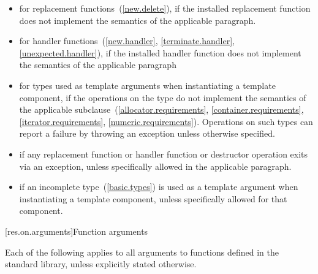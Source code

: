 \begin{itemize}
\item
for replacement functions~(\ref{new.delete}), if the installed replacement function does not
implement the semantics of the applicable
\required
paragraph.
\item
for handler functions~(\ref{new.handler}, \ref{terminate.handler}, \ref{unexpected.handler}),
if the installed handler function does not implement the semantics of the applicable
\required
paragraph
\item
for types used as template arguments when instantiating a template component,
if the operations on the type do not implement the semantics of the applicable
subclause~(\ref{allocator.requirements}, \ref{container.requirements}, \ref{iterator.requirements},
\ref{numeric.requirements}).
Operations on such types can report a failure by throwing an exception
unless otherwise specified.
\item
if any replacement function or handler function or destructor operation exits via an exception,
unless specifically allowed
in the applicable
\required
paragraph.
\item
if an incomplete type~(\ref{basic.types}) is used as a template
argument when instantiating a template component, unless specifically
allowed for that component.
\end{itemize}

[res.on.arguments]{Function arguments}

\pnum
{}%
%
Each of the following applies to all arguments
%
to functions defined in the \Cpp standard library,%
unless explicitly stated otherwise.

